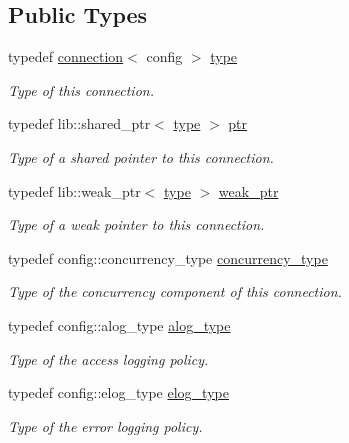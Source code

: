 \subsection*{Public Types}
\begin{DoxyCompactItemize}
\item 
typedef \hyperlink{classwebsocketpp_1_1connection}{connection}$<$ config $>$ \hyperlink{classwebsocketpp_1_1connection_a6d09aefdf1e35c0169b26ab92a4dee34}{type}
\begin{DoxyCompactList}\small\item\em Type of this connection. \end{DoxyCompactList}\item 
typedef lib\+::shared\+\_\+ptr$<$ \hyperlink{classwebsocketpp_1_1connection_a6d09aefdf1e35c0169b26ab92a4dee34}{type} $>$ \hyperlink{classwebsocketpp_1_1connection_ab910d42e3bde91546183cc54642f32ab}{ptr}
\begin{DoxyCompactList}\small\item\em Type of a shared pointer to this connection. \end{DoxyCompactList}\item 
typedef lib\+::weak\+\_\+ptr$<$ \hyperlink{classwebsocketpp_1_1connection_a6d09aefdf1e35c0169b26ab92a4dee34}{type} $>$ \hyperlink{classwebsocketpp_1_1connection_ac2905dcf6418c52ec9685f9f59b86e3e}{weak\+\_\+ptr}
\begin{DoxyCompactList}\small\item\em Type of a weak pointer to this connection. \end{DoxyCompactList}\item 
typedef config\+::concurrency\+\_\+type \hyperlink{classwebsocketpp_1_1connection_a9db8af56881450fbba5c6ff1060c569a}{concurrency\+\_\+type}
\begin{DoxyCompactList}\small\item\em Type of the concurrency component of this connection. \end{DoxyCompactList}\item 
typedef config\+::alog\+\_\+type \hyperlink{classwebsocketpp_1_1connection_a2da7d18aecf9153429bab9fcd2bab7b8}{alog\+\_\+type}
\begin{DoxyCompactList}\small\item\em Type of the access logging policy. \end{DoxyCompactList}\item 
typedef config\+::elog\+\_\+type \hyperlink{classwebsocketpp_1_1connection_a80314ab2e4ddefdd4783fb1934fedee6}{elog\+\_\+type}
\begin{DoxyCompactList}\small\item\em Type of the error logging policy. \end{DoxyCompactList}\item 

\end{DoxyCompactItemize}
